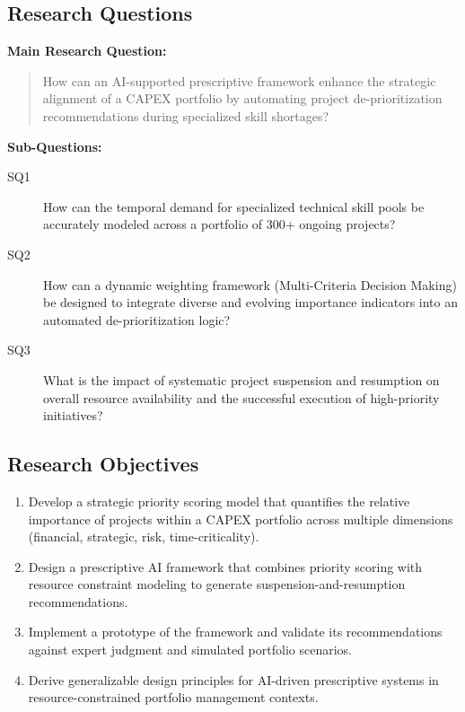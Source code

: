 \subsection*{Research Questions}

\noindent\textbf{Main Research Question:}
\begin{quote}
  How can an AI-supported prescriptive framework enhance the strategic alignment of a CAPEX
  portfolio by automating project de-prioritization recommendations during specialized skill
  shortages?
\end{quote}

\noindent\textbf{Sub-Questions:}

\begin{description}
  \item[SQ1] How can the temporal demand for specialized technical skill pools be accurately
  modeled across a portfolio of 300+ ongoing projects?

  \item[SQ2] How can a dynamic weighting framework (Multi-Criteria Decision Making) be
  designed to integrate diverse and evolving importance indicators into an automated
  de-prioritization logic?

  \item[SQ3] What is the impact of systematic project suspension and resumption on overall
  resource availability and the successful execution of high-priority initiatives?
\end{description}

\subsection*{Research Objectives}

\begin{enumerate}
  \item Develop a strategic priority scoring model that quantifies the relative importance of
        projects within a CAPEX portfolio across multiple dimensions (financial, strategic,
        risk, time-criticality).
  \item Design a prescriptive AI framework that combines priority scoring with resource
        constraint modeling to generate suspension-and-resumption recommendations.
  \item Implement a prototype of the framework and validate its recommendations against expert
        judgment and simulated portfolio scenarios.
  \item Derive generalizable design principles for AI-driven prescriptive systems in
        resource-constrained portfolio management contexts.
\end{enumerate}


